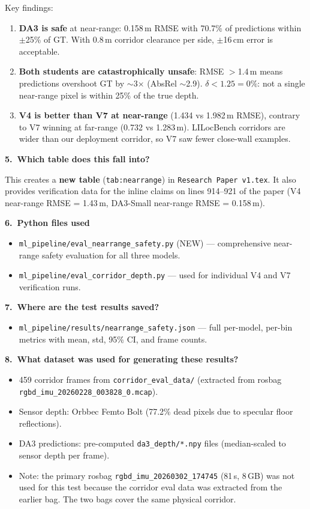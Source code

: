 \documentclass[11pt,a4paper]{article}
\begin{document}
Key findings:
\begin{enumerate}[nosep]
  \item \textbf{DA3 is safe} at near-range: 0.158\,m RMSE with 70.7\%
    of predictions within $\pm$25\% of GT. With 0.8\,m corridor
    clearance per side, $\pm$16\,cm error is acceptable.
  \item \textbf{Both students are catastrophically unsafe}: RMSE
    $>$1.4\,m means predictions overshoot GT by $\sim$3$\times$
    (AbsRel $\sim$2.9). $\delta < 1.25 = 0\%$: not a single
    near-range pixel is within 25\% of the true depth.
  \item \textbf{V4 is better than V7 at near-range} (1.434 vs
    1.982\,m RMSE), contrary to V7 winning at far-range (0.732 vs
    1.283\,m). LILocBench corridors are wider than our deployment
    corridor, so V7 saw fewer close-wall examples.
\end{enumerate}

\textbf{5.\ Which table does this fall into?}

This creates a \textbf{new table} (\texttt{tab:nearrange}) in
\texttt{Research Paper v1.tex}. It also provides verification data
for the inline claims on lines 914--921 of the paper
(V4 near-range RMSE = 1.43\,m, DA3-Small near-range RMSE = 0.158\,m).

\textbf{6.\ Python files used}

\begin{itemize}[nosep]
  \item \texttt{ml\_pipeline/eval\_nearrange\_safety.py} (NEW) ---
    comprehensive near-range safety evaluation for all three models.
  \item \texttt{ml\_pipeline/eval\_corridor\_depth.py} --- used for
    individual V4 and V7 verification runs.
\end{itemize}

\textbf{7.\ Where are the test results saved?}

\begin{itemize}[nosep]
  \item \texttt{ml\_pipeline/results/nearrange\_safety.json} ---
    full per-model, per-bin metrics with mean, std, 95\% CI, and
    frame counts.
\end{itemize}

\textbf{8.\ What dataset was used for generating these results?}

\begin{itemize}[nosep]
  \item 459 corridor frames from \texttt{corridor\_eval\_data/}
    (extracted from rosbag \texttt{rgbd\_imu\_20260228\_003828\_0.mcap}).
  \item Sensor depth: Orbbec Femto Bolt (77.2\% dead pixels due to
    specular floor reflections).
  \item DA3 predictions: pre-computed \texttt{da3\_depth/*.npy} files
    (median-scaled to sensor depth per frame).
  \item Note: the primary rosbag \texttt{rgbd\_imu\_20260302\_174745}
    (81\,s, 8\,GB) was not used for this test because the corridor
    eval data was extracted from the earlier bag. The two bags cover
    the same physical corridor.
\end{itemize}
\end{document}
